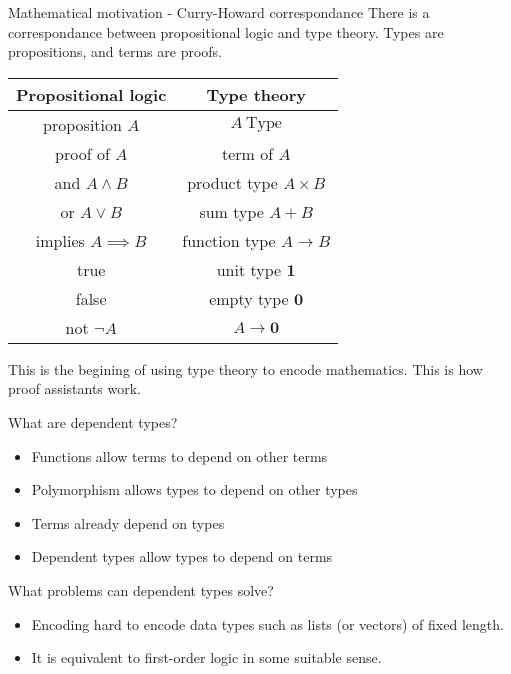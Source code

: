 \documentclass[usenames,dvipsnames]{beamer}
\begin{document}
    \begin{frame}{Mathematical motivation - Curry-Howard correspondance}
        There is a correspondance between propositional logic and type theory. Types are propositions, and terms are proofs.
        \begin{table}
            \begin{tabular}{c || c}
                \textbf{Propositional logic} & \textbf{Type theory} \\
                \hline\hline
                proposition $A$         & $A\ \text{Type}$          \\
                proof of $A$            & term of $A$               \\
                and $A \land B$         & product type $A \times B$ \\
                or $A \lor B$           & sum type $A + B$          \\
                implies $A \implies B$  & function type $A \to B$   \\
                true                    & unit type $\mathbf{1}$    \\
                false                   & empty type $\mathbf{0}$   \\
                not $¬A$                & $A \to \mathbf{0}$        \\
            \end{tabular}
        \end{table}
        
        This is the begining of using type theory to encode mathematics.
        This is how proof assistants work.
    \end{frame}
    
    \begin{frame}{What are dependent types?}
        \begin{itemize}
            \item Functions allow terms to depend on other terms
            \item Polymorphism allows types to depend on other types
            \item Terms already depend on types
            \item Dependent types allow types to depend on terms
        \end{itemize}
        What problems can dependent types solve?
        \begin{itemize}
            \item Encoding hard to encode data types such as lists (or vectors) of fixed length.
            \item It is equivalent to first-order logic in some suitable sense.
        \end{itemize}
    \end{frame}
    
\end{document}
